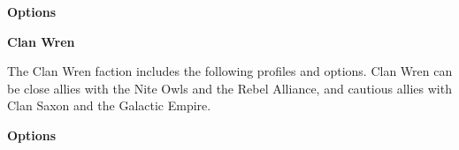 \documentclass{article}
\begin{document}
\vspace{0.3cm}
{\scriptsize
\setlength\extrarowheight{1.5pt}

}
\vspace{0.6cm}

{\large \textbf{Options}}
\vspace{0.3cm}
\begin{multicols}{2}
    {\scriptsize

    \setlength\extrarowheight{1.5pt}
    

    \vspace{0.6cm}

    \setlength\extrarowheight{1.5pt}
    

    }
\end{multicols}

\vspace{0.6cm}

{\Large \textbf{Clan Wren}}
\vspace{0.3cm}

\begin{minipage}{19cm}
    The Clan Wren faction includes the following profiles and options.
    Clan Wren can be close allies with the Nite Owls and the Rebel Alliance, and
    cautious allies with Clan Saxon and the Galactic Empire.
\end{minipage}

\vspace{0.3cm}
{\scriptsize
\setlength\extrarowheight{1.5pt}

}
\vspace{0.6cm}

{\large \textbf{Options}}
\vspace{0.3cm}
\begin{multicols}{2}
    {\scriptsize

    \setlength\extrarowheight{1.5pt}
    

    \vspace{0.6cm}

    \setlength\extrarowheight{1.5pt}
    

    \vspace{0.6cm}

    \setlength\extrarowheight{1.5pt}
    

    \vspace{0.6cm}

    \setlength\extrarowheight{1.5pt}
    

    \vspace{0.6cm}

    \setlength\extrarowheight{1.5pt}
    

    }
\end{multicols}
\vspace{0.6cm}
\end{document}
